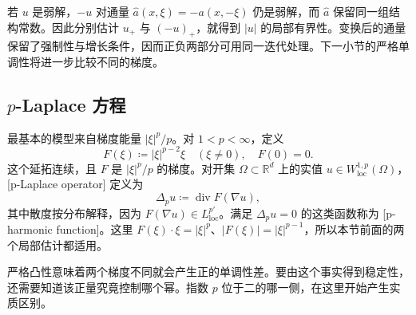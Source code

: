 若 \(u\) 是弱解，\(-u\) 对通量 \(\widehat a(x,\xi)=-a(x,-\xi)\) 仍是弱解，而 \(\widehat a\) 保留同一组结构常数。因此分别估计 \(u_+\) 与 \((-u)_+\)，就得到 \(|u|\) 的局部有界性。变换后的通量保留了强制性与增长条件，因而正负两部分可用同一迭代处理。下一小节的严格单调性将进一步比较不同的梯度。

\subsection{\texorpdfstring{\(p\)}{p}-Laplace 方程}
\label{b2:subsec:H20202}

最基本的模型来自梯度能量 \(|\xi|^p/p\)。对 \(1<p<\infty\)，定义
\[
 F(\xi)\coloneqq|\xi|^{p-2}\xi\quad(\xi\ne0),
 \quad F(0)=0.
\]
这个延拓连续，且 \(F\) 是 \(|\xi|^p/p\) 的梯度。对开集 \(\Omega\subset\mathbb R^d\) 上的实值 \(u\in W^{1,p}_{\mathrm{loc}}(\Omega)\)，[p-Laplace operator] 定义为
\[
 \Delta_pu\coloneqq\operatorname{div}F(\nabla u),
\]
其中散度按分布解释，因为 \(F(\nabla u)\in L^{p'}_{\mathrm{loc}}\)。满足 \(\Delta_pu=0\) 的这类函数称为 [p-harmonic function]。这里 \(F(\xi)\cdot\xi=|\xi|^p\)、\(|F(\xi)|=|\xi|^{p-1}\)，所以本节前面的两个局部估计都适用。

\ProseParagraphBreak

严格凸性意味着两个梯度不同就会产生正的单调性差。要由这个事实得到稳定性，还需要知道该正量究竟控制哪个幂。指数 \(p\) 位于二的哪一侧，在这里开始产生实质区别。

